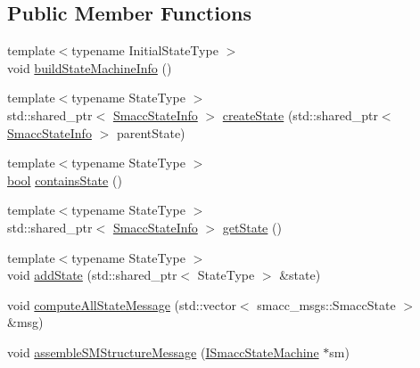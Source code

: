 \subsection*{Public Member Functions}
\begin{DoxyCompactItemize}
\item 
{\footnotesize template$<$typename Initial\+State\+Type $>$ }\\void \hyperlink{classsmacc_1_1introspection_1_1SmaccStateMachineInfo_a1482f3d6b3aff8a2702331bd3049987a}{build\+State\+Machine\+Info} ()
\item 
{\footnotesize template$<$typename State\+Type $>$ }\\std\+::shared\+\_\+ptr$<$ \hyperlink{classsmacc_1_1introspection_1_1SmaccStateInfo}{Smacc\+State\+Info} $>$ \hyperlink{classsmacc_1_1introspection_1_1SmaccStateMachineInfo_ad3eacdb32594e603fb36a8ab478d0ce7}{create\+State} (std\+::shared\+\_\+ptr$<$ \hyperlink{classsmacc_1_1introspection_1_1SmaccStateInfo}{Smacc\+State\+Info} $>$ parent\+State)
\item 
{\footnotesize template$<$typename State\+Type $>$ }\\\hyperlink{classbool}{bool} \hyperlink{classsmacc_1_1introspection_1_1SmaccStateMachineInfo_aa120497a9fc4cb4a05f6a27ff3be26cb}{contains\+State} ()
\item 
{\footnotesize template$<$typename State\+Type $>$ }\\std\+::shared\+\_\+ptr$<$ \hyperlink{classsmacc_1_1introspection_1_1SmaccStateInfo}{Smacc\+State\+Info} $>$ \hyperlink{classsmacc_1_1introspection_1_1SmaccStateMachineInfo_ab2970707b3eec89f70aba88612ab0ca5}{get\+State} ()
\item 
{\footnotesize template$<$typename State\+Type $>$ }\\void \hyperlink{classsmacc_1_1introspection_1_1SmaccStateMachineInfo_ab4eafccfbba21257405fc4274c2ed22a}{add\+State} (std\+::shared\+\_\+ptr$<$ State\+Type $>$ \&state)
\item 
void \hyperlink{classsmacc_1_1introspection_1_1SmaccStateMachineInfo_a0722293cbe7b231ac333de15ae3751e8}{compute\+All\+State\+Message} (std\+::vector$<$ smacc\+\_\+msgs\+::\+Smacc\+State $>$ \&msg)
\item 
void \hyperlink{classsmacc_1_1introspection_1_1SmaccStateMachineInfo_a6758065a8d1faaa7c3688cf0dffe9334}{assemble\+S\+M\+Structure\+Message} (\hyperlink{classsmacc_1_1ISmaccStateMachine}{I\+Smacc\+State\+Machine} $\ast$sm)
\end{DoxyCompactItemize}
